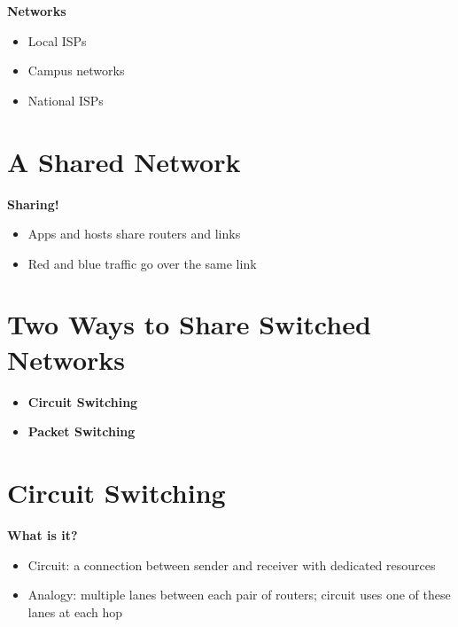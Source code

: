 \documentclass[9pt]{extarticle}
\begin{document}
\begin{multicols*}{3}
\textbf{Networks}
\begin{itemize}
    \item Local ISPs
    \item Campus networks
    \item National ISPs
\end{itemize}

{\color{sectioncolor}\section*{\centering A Shared Network}}
\textbf{Sharing!}
\begin{itemize}
    \item Apps and hosts share routers and links
    \item Red and blue traffic go over the same link
\end{itemize}

\begin{center}
\end{center}

{\color{sectioncolor}\section*{\centering Two Ways to Share Switched Networks}}
\begin{itemize}
    \item \textbf{Circuit Switching}
    \item \textbf{Packet Switching}
\end{itemize}

{\color{sectioncolor}\section*{\centering Circuit Switching}}
\textbf{What is it?}
\begin{itemize}
    \item Circuit: a connection between sender and receiver with dedicated resources
    \item Analogy: multiple lanes between each pair of routers; circuit uses one of these lanes at each hop
\end{itemize}


\end{multicols*}
\end{document}
